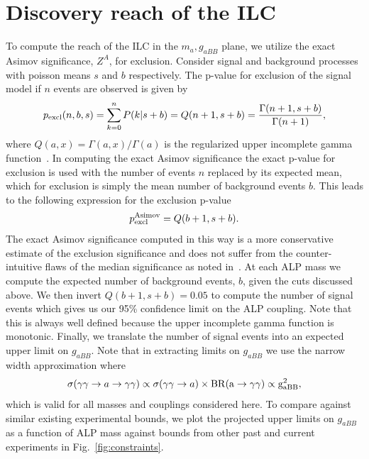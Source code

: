 \documentclass[aps,onecolumn,twoside,secnumarabic,12pt,balancelastpage,amsmath,amssymb,nofootinbib,hyperref=pdftex]{revtex4}
\begin{document}
\section{Discovery reach of the ILC}
To compute the reach of the ILC in the $m_{a},g_{aBB}$ plane, we utilize the exact Asimov significance, $Z^{A}$, for exclusion\cite{Bhattiprolu:2020mwi}. Consider signal and background processes with poisson means $s$ and $b$ respectively. The p-value for exclusion of the signal model if $n$ events are observed is given by 
\begin{equation}
p_{\rm{excl}}(n,b,s) = \sum_{k=0}^{n}P(k | s+b) = Q(n+1, s+b) = \frac{\Gamma(n+1, s+b)}{\Gamma(n+1)},
\end{equation}
where $Q(a,x) = \Gamma(a, x)/\Gamma(a)$ is the regularized upper incomplete gamma function~\cite{math_gam}. In computing the exact Asimov significance the exact p-value for exclusion is used with the number of events $n$ replaced by its expected mean, which for exclusion is simply the mean number of background events $b$. This leads to the following expression for the exclusion p-value
\begin{equation}
p_{\rm excl}^{\rm Asimov} = Q(b+1,s+b).
\end{equation}
The exact Asimov significance computed in this way is a more conservative estimate of the exclusion significance and does not suffer from the counter-intuitive flaws of the median significance as noted in~\cite{Bhattiprolu:2020mwi}.
\vskip 0.12in
At each ALP mass we compute the expected number of background events, $b$, given the cuts discussed above. We then invert $Q(b+1,s+b) = 0.05$ to compute the number of signal events which gives us our 95\% confidence limit on the ALP coupling. Note that this is always well defined because the upper incomplete gamma function is monotonic. Finally, we translate the number of signal events into an expected upper limit on $g_{aBB}$. Note that in extracting limits on $g_{aBB}$ we use the narrow width approximation where
\begin{equation}
\sigma(\gamma\gamma \rightarrow a \rightarrow \gamma\gamma) \propto \sigma(\gamma\gamma \rightarrow a ) \times \rm{BR}( a\rightarrow\gamma\gamma ) \propto g_{aBB}^{2},
\end{equation}
which is valid for all masses and couplings considered here.
To compare against similar existing experimental bounds, we plot the projected upper limits on $g_{aBB}$ as a function of ALP mass against bounds from other past and current experiments in Fig.~\ref{fig:constraints}.
\end{document}
